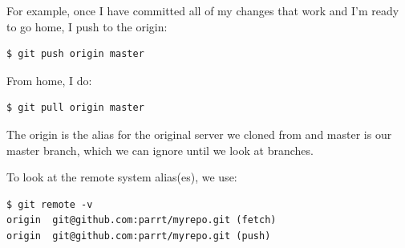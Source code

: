 \documentclass[titlepage]{tufte-book}
\begin{document}
For example, once I have committed all of my changes that work and I'm ready to go home, I push to the origin:

\begin{lstlisting}[style=BashInputStyle]
$ git push origin master
\end{lstlisting}

\noindent From home, I do:

\begin{lstlisting}[style=BashInputStyle]
$ git pull origin master
\end{lstlisting}

\noindent The origin is the alias for the original server we cloned from and master is our master branch, which we can ignore until we look at branches.

To look at the remote system alias(es), we use:

\begin{lstlisting}[style=BashInputStyle]
$ git remote -v
origin  git@github.com:parrt/myrepo.git (fetch)
origin  git@github.com:parrt/myrepo.git (push)
\end{lstlisting}
\end{document}
